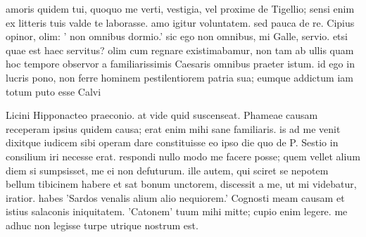 


 amoris quidem tui, quoquo me verti, vestigia, vel proxime de Tigellio; sensi enim ex litteris tuis valde te laborasse. amo igitur voluntatem. sed pauca de re. Cipius opinor, olim: ' non omnibus dormio.' sic ego non omnibus, mi Galle, servio. etsi quae est haec servitus? olim cum regnare existimabamur, non tam ab ullis quam hoc tempore observor a familiarissimis Caesaris omnibus praeter istum. id ego in lucris pono, non ferre hominem pestilentiorem patria sua; eumque addictum iam totum puto esse Calvi

 Licini Hipponacteo praeconio. at vide quid suscenseat. Phameae causam receperam ipsius quidem causa; erat enim mihi sane familiaris. is ad me venit dixitque iudicem sibi operam dare constituisse eo ipso die quo de P. Sestio in consilium iri necesse erat. respondi nullo modo me facere posse; quem vellet alium diem si sumpsisset, me ei non defuturum. ille autem, qui sciret se nepotem bellum tibicinem habere et sat bonum unctorem, discessit a me, ut mi videbatur, iratior. habes 'Sardos venalis alium alio nequiorem.' Cognosti meam causam et istius salaconis iniquitatem. 'Catonem' tuum mihi mitte; cupio enim legere. me adhuc non legisse turpe utrique nostrum est.
